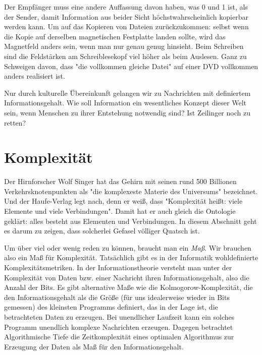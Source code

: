 \documentclass[12pt]{book}
\begin{document}
Der Empfänger muss eine andere Auffassung davon haben, was 0 und 1 ist, als der Sender, damit Information aus beider Sicht höchstwahrscheinlich kopierbar werden kann. Um auf das Kopieren von Dateien zurückzukommen: selbst wenn die Kopie auf derselben magnetischen Festplatte landen sollte, wird das Magnetfeld anders sein, wenn man nur genau genug hinsieht. Beim Schreiben sind die Feldstärken am Schreiblesekopf viel höher als beim Auslesen. Ganz zu Schweigen davon, dass "die vollkommen gleiche Datei" auf einer DVD vollkommen anders realisiert ist. 

Nur durch kulturelle Übereinkunft gelangen wir zu Nachrichten mit definiertem Informationsgehalt. Wie soll Information ein wesentliches Konzept dieser Welt sein, wenn Menschen zu ihrer Entstehung notwendig sind? Ist Zeilinger noch zu retten? 

\section{Komplexität}

Der Hirnforscher Wolf Singer hat das Gehirn mit seinen rund 500 Billionen Verkehrsknotenpunkten als "die komplexeste Materie des Universums" bezeichnet. 
Und der Haufe-Verlag legt nach, denn er weiß, dass "Komplexität heißt: viele Elemente und viele Verbindungen". Damit hat er auch gleich die Ontologie geklärt: alles besteht aus Elementen und Verbindungen. In diesem Abschnitt geht es darum zu zeigen, dass solcherlei Gefasel völliger Quatsch ist.

Um über viel oder wenig reden zu können, braucht man ein \emph{Maß}. Wir brauchen also ein Maß für Komplexität. Tatsächlich gibt es in der Informatik wohldefinierte Komplexitätsmetriken.
In der Informationstheorie versteht man unter der Komplexität von Daten bzw. einer Nachricht ihren Informationsgehalt, also die Anzahl der Bits. Es gibt alternative Maße wie die Kolmogorow-Komplexität, die den Informationsgehalt als die Größe (für uns idealerweise wieder in Bits gemessen) des kleinsten Programms definiert, das in der Lage ist, die betrachteten Daten zu erzeugen. Bei unendlicher Laufzeit kann ein solches Programm unendlich komplexe Nachrichten erzeugen. Dagegen betrachtet Algorithmische Tiefe die Zeitkomplexität eines optimalen Algorithmus zur Erzeugung der Daten als Maß für den Informationsgehalt.
\end{document}
